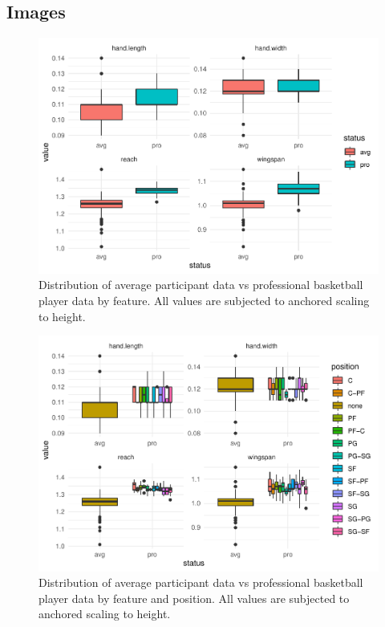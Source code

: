 \documentclass[]{article}
\begin{document}
\subsection{Images}
\label{sec:appendix-Images}

\begin{figure}
\centering
\includegraphics{project-measure-writeup_files/figure-latex/image-proportion-comparison-1.pdf}
\caption{Distribution of average participant data vs professional
basketball player data by feature. All values are subjected to anchored
scaling to height.}
\end{figure}

\begin{figure}
\centering
\includegraphics{project-measure-writeup_files/figure-latex/appendix-boxplot-1.pdf}
\caption{Distribution of average participant data vs professional
basketball player data by feature and position. All values are subjected
to anchored scaling to height.}
\end{figure}
\end{document}
